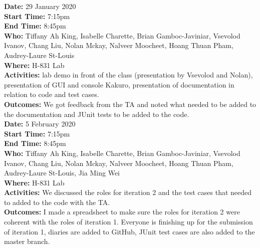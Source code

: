 \documentclass[12pt]{article}
\begin{document}
{\bf Date:} 29 January 2020 \\
{\bf Start Time:} 7:15pm\\
{\bf End Time:} 8:45pm\\
{\bf Who:} Tiffany Ah King, Isabelle Charette, Brian Gamboc-Javiniar, Vsevolod Ivanov, Chang Liu, Nolan Mckay, Nalveer Moocheet, Hoang Thuan Pham, Audrey-Laure St-Louis\\
{\bf Where:} H-831 Lab \\
{\bf Activities:} lab demo in front of the class (presentation by Vsevolod and Nolan), presentation of GUI and console Kakuro, presentation of documentation in relation to code and test cases. \\
{\bf Outcomes:} We got feedback from the TA and noted what needed to be added to the documentation and JUnit tests to be added to the code. \\

{\bf Date:} 5 February 2020 \\
{\bf Start Time:} 7:15pm\\
{\bf End Time:} 8:45pm\\
{\bf Who:} Tiffany Ah King, Isabelle Charette, Brian Gamboc-Javiniar, Vsevolod Ivanov, Chang Liu, Nolan Mckay, Nalveer Moocheet, Hoang Thuan Pham, Audrey-Laure St-Louis, Jia Ming Wei\\
{\bf Where:} H-831 Lab \\
{\bf Activities:}  We discussed the roles for iteration 2 and the test cases that needed to added to the code with the TA.\\
{\bf Outcomes:} I made a spreadsheet to make sure the roles for iteration 2 were coherent with the roles of iteration 1. Everyone is finishing up for the submission of iteration 1, diaries are added to GitHub, JUnit test cases are also added to the master branch.\\


\end{document}
